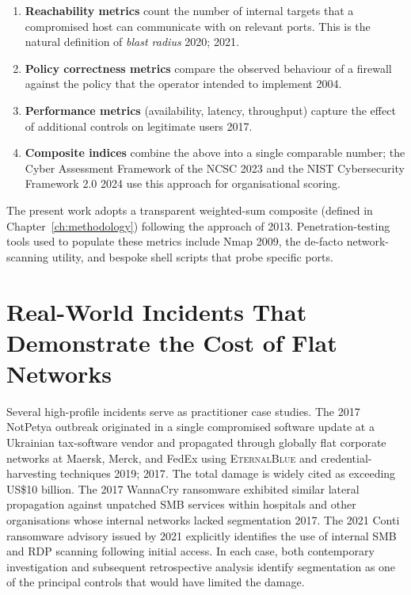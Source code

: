 \begin{enumerate}[leftmargin=*]
    \item \textbf{Reachability metrics} count the number of internal targets that a compromised host can communicate with on relevant ports. This is the natural definition of \emph{blast radius} \parencite{Rose et al.}{2020}; \parencite{VMware}{2021}.
    \item \textbf{Policy correctness metrics} compare the observed behaviour of a firewall against the policy that the operator intended to implement \parencite{Wool}{2004}.
    \item \textbf{Performance metrics} (availability, latency, throughput) capture the effect of additional controls on legitimate users \parencite{Stallings}{2017}.
    \item \textbf{Composite indices} combine the above into a single comparable number; the Cyber Assessment Framework of the NCSC \parencite{NCSC}{2023} and the NIST Cybersecurity Framework 2.0 \parencite{NIST}{2024} use this approach for organisational scoring.
\end{enumerate}

The present work adopts a transparent weighted-sum composite (defined in Chapter~\ref{ch:methodology}) following the approach of \textcite{Cherdantseva and Hilton}{2013}. Penetration-testing tools used to populate these metrics include Nmap \parencite{Lyon}{2009}, the de-facto network-scanning utility, and bespoke shell scripts that probe specific ports.

\section{Real-World Incidents That Demonstrate the Cost of Flat Networks}

Several high-profile incidents serve as practitioner case studies. The 2017 NotPetya outbreak originated in a single compromised software update at a Ukrainian tax-software vendor and propagated through globally flat corporate networks at Maersk, Merck, and FedEx using \textsc{EternalBlue} and credential-harvesting techniques \parencite{Greenberg}{2019}; \parencite{Greene}{2017}. The total damage is widely cited as exceeding US\$10 billion. The 2017 WannaCry ransomware exhibited similar lateral propagation against unpatched SMB services within hospitals and other organisations whose internal networks lacked segmentation \parencite{Microsoft Threat Intelligence Center}{2017}. The 2021 Conti ransomware advisory issued by \textcite{CISA}{2021} explicitly identifies the use of internal SMB and RDP scanning following initial access. In each case, both contemporary investigation and subsequent retrospective analysis identify segmentation as one of the principal controls that would have limited the damage.

